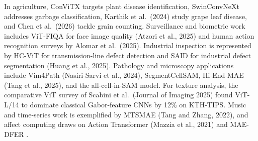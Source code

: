 \documentclass{article}
\begin{document}
In agriculture, ConViTX targets plant disease identification, SwinConvNeXt addresses garbage classification, Karthik et al.~(2024) study grape leaf disease, and Chen et al.~(2026) tackle grain counting. Surveillance and biometric work includes ViT-FIQA for face image quality (Atzori et al., 2025) and human action recognition surveys by Alomar et al.~(2025). Industrial inspection is represented by HC-ViT for transmission-line defect detection \citep{zhang2023vitaev2visiontrans} and SAID for industrial defect segmentation (Huang et al., 2025). Pathology and microscopy applications include Vim4Path (Nasiri-Sarvi et al., 2024), SegmentCellSAM, Hi-End-MAE (Tang et al., 2025), and the all-cell-in-SAM model. For texture analysis, the comparative ViT survey of Scabini et al.~(Journal of Imaging 2025) found ViT-L/14 to dominate classical Gabor-feature CNNs by 12\% on KTH-TIPS. Music and time-series work is exemplified by MTSMAE (Tang and Zhang, 2022), and affect computing draws on Action Transformer (Mazzia et al., 2021) and MAE-DFER \citep{sun2022vicinityvisiontran}.
\end{document}
